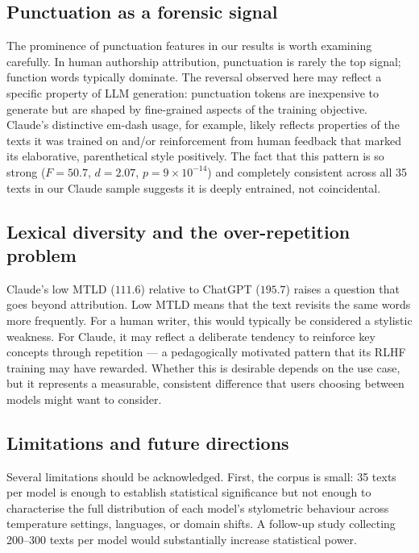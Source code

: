 \documentclass[11pt,a4paper]{article}
\begin{document}
\subsection{Punctuation as a forensic signal}

The prominence of punctuation features in our results is worth
examining carefully. In human authorship attribution, punctuation is
rarely the top signal; function words typically dominate. The
reversal observed here may reflect a specific property of LLM
generation: punctuation tokens are inexpensive to generate but are
shaped by fine-grained aspects of the training objective. Claude's
distinctive em-dash usage, for example, likely reflects properties of
the texts it was trained on and/or reinforcement from human feedback
that marked its elaborative, parenthetical style positively. The fact
that this pattern is so strong ($F = 50.7$, $d = 2.07$, $p =
9 \times 10^{-14}$) and completely consistent across all 35 texts
in our Claude sample suggests it is deeply entrained, not
coincidental.

\subsection{Lexical diversity and the over-repetition problem}

Claude's low MTLD ($111.6$) relative to ChatGPT ($195.7$) raises a
question that goes beyond attribution. Low MTLD means that the text
revisits the same words more frequently. For a human writer, this
would typically be considered a stylistic weakness. For Claude, it may
reflect a deliberate tendency to reinforce key concepts through
repetition --- a pedagogically motivated pattern that its RLHF
training may have rewarded. Whether this is desirable depends on the
use case, but it represents a measurable, consistent difference that
users choosing between models might want to consider.

\subsection{Limitations and future directions}

Several limitations should be acknowledged. First, the corpus is
small: 35 texts per model is enough to establish statistical
significance but not enough to characterise the full distribution of
each model's stylometric behaviour across temperature settings,
languages, or domain shifts. A follow-up study collecting 200--300
texts per model would substantially increase statistical power.
\end{document}
